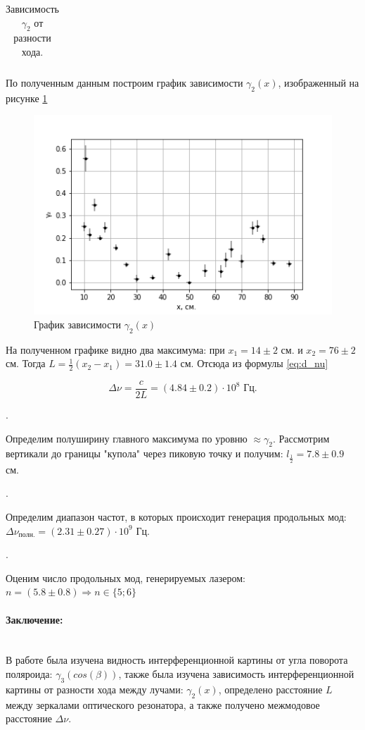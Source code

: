 \documentclass[a4paper, 12pt]{article}
\newcommand{\parag}[1]{\paragraph*{#1:}}
\newcounter{Points}
\newcommand{\point}{\arabic{Points}. \addtocounter{Points}{1}}
\begin{document}
\begin{table}[h]
\begin{tabular}{|c|c|c|c|c|c|c|c|c|c|c|}
\end{tabular}
\caption{Зависимость $\gamma_2$ от разности хода.}
\label{tabl:x_to_gammas}
\end{table}


По полученным данным построим график зависимости $\gamma_2(x)$, изображенный на рисунке \ref{img:gamma_from_x}

\begin{figure}
    \centering
    \includegraphics{gamma_from_x.png}
    \caption{График зависимости $\gamma_2(x)$}
    \label{img:gamma_from_x}
\end{figure}

На полученном графике видно два максимума: при $x_1 = 14 \pm 2$ см. и $x_2 = 76 \pm 2$ см.  Тогда $L = \frac{1}{2}(x_2 - x_1) = 31.0 \pm 1.4 \text{ см}$. Отсюда из формулы \eqref{eq:d_nu}

$$
\Delta \nu = \dfrac{c}{2L} = (4.84 \pm 0.2) \cdot 10^8 \text{ Гц}.
$$

\point Определим полуширину главного максимума по уровню $\approx \gamma_2$. Рассмотрим вертикали до границы "купола" через пиковую точку и получим: $l_{\frac{1}{2}} = 7.8 \pm 0.9$ см.

\point Определим диапазон частот, в которых происходит генерация продольных мод:
$\Delta \nu_{полн.} = (2.31 \pm 0.27) \cdot 10^9$ Гц.

\point Оценим число продольных мод, генерируемых лазером:
$ n = (5.8 \pm 0.8) \Rightarrow n \in \{5; 6\}$

\parag {Заключение} ~\\
В работе была изучена видность интерференционной картины от угла поворота поляроида: $\gamma_3(cos(\beta))$, также была изучена зависимость интерференционной картины от разности хода между лучами: $\gamma_2(x)$, определено расстояние $L$ между зеркалами оптического резонатора, а также получено межмодовое расстояние $\Delta \nu$.
\end{document}
